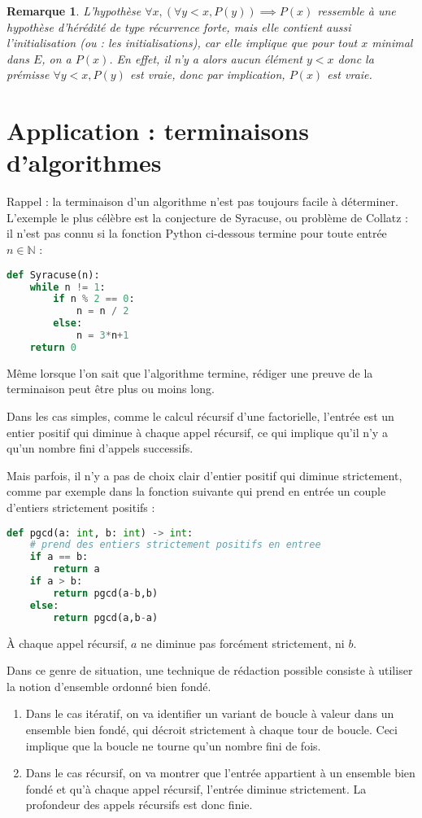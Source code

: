 \documentclass[12pt]{article}
\newtheorem{remarque}[thm]{Remarque}
\newcommand{\N}{\mathbb{N}}
\begin{document}
\begin{remarque}
L'hypothèse $\forall x, (\forall y< x, P(y)) \implies P(x)$ ressemble à une hypothèse d'hérédité de type récurrence forte, mais elle contient aussi l'initialisation (ou : les initialisations), car elle implique que pour tout $x$ minimal dans $E$, on a $P(x)$. En effet, il n'y a alors aucun élément $y<x$ donc la prémisse $\forall y< x, P(y)$ est vraie, donc par implication, $P(x)$ est vraie.
\end{remarque}


\section{Application : terminaisons d'algorithmes}

Rappel : la terminaison d'un algorithme n'est pas toujours facile à déterminer.
L'exemple le plus célèbre est  la conjecture de Syracuse, ou problème de Collatz : il n'est pas connu si la fonction Python ci-dessous termine pour toute entrée $n\in\N$ :

\begin{lstlisting}[language=Python]
def Syracuse(n):
	while n != 1:
		if n % 2 == 0:
			n = n / 2
		else:
			n = 3*n+1
	return 0 
\end{lstlisting}

Même lorsque l'on sait que l'algorithme termine, rédiger une preuve de la terminaison peut être plus ou moins long.

Dans les cas simples, comme le calcul récursif d'une factorielle, l'entrée est un entier positif qui diminue à chaque appel récursif, ce qui implique qu'il n'y a qu'un nombre fini d'appels successifs.

Mais parfois, il n'y a pas de choix clair d'entier positif qui diminue strictement, comme par exemple dans la fonction suivante qui prend en entrée un couple d'entiers strictement positifs : 
\begin{lstlisting}[language=Python]
def pgcd(a: int, b: int) -> int:
	# prend des entiers strictement positifs en entree
	if a == b:
		return a
	if a > b:
		return pgcd(a-b,b)
	else:
		return pgcd(a,b-a)
\end{lstlisting}

À chaque appel récursif, $a$ ne diminue pas forcément strictement, ni $b$.

Dans ce genre de situation, une technique de rédaction possible consiste à utiliser la notion d'ensemble ordonné bien fondé.

\begin{enumerate}
\item Dans le cas itératif, on va identifier un variant de boucle à valeur dans un ensemble bien fondé, qui décroit strictement à chaque tour de boucle. Ceci implique que la boucle ne tourne qu'un nombre fini de fois.
\item Dans le cas récursif, on va montrer que l'entrée appartient à un ensemble  bien fondé et qu'à chaque appel récursif,  l'entrée diminue strictement. La profondeur des appels récursifs est donc finie.
\end{enumerate}
\end{document}
